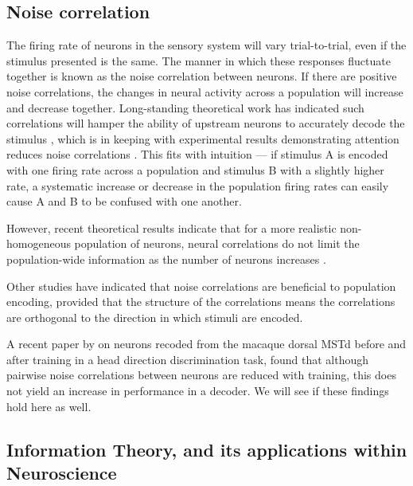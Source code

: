 \subsection{Noise correlation}

The firing rate of neurons in the sensory system will vary trial-to-trial, even if the stimulus presented is the same.
The manner in which these responses fluctuate together is known as the noise correlation between neurons.
If there are positive noise correlations, the changes in neural activity across a population will increase and decrease together.
Long-standing theoretical work has indicated such correlations will hamper the ability of upstream neurons to accurately decode the stimulus%
, which is in keeping with experimental results demonstrating attention reduces noise correlations \citep{Cohen2009}.
This fits with intuition --- if stimulus A is encoded with one firing rate across a population and stimulus B with a slightly higher rate, a systematic increase or decrease in the population firing rates can easily cause A and B to be confused with one another.

However, recent theoretical results indicate that for a more realistic non-homogeneous population of neurons, neural correlations do not limit the population-wide information as the number of neurons increases \citep{Oram1998,Averbeck2006,Ecker2011}.

Other studies have indicated that noise correlations are beneficial to population encoding, provided that the structure of the correlations means the correlations are orthogonal to the direction in which stimuli are encoded.

A recent paper by \citet{Gu2011} on neurons recoded from the macaque dorsal \ac{MSTd} before and after training in a head direction discrimination task, found that although pairwise noise correlations between neurons are reduced with training, this does not yield an increase in performance in a decoder.
We will see if these findings hold here as well.

\subsection{Information Theory, and its applications within Neuroscience}
\label{sec:bgit}

